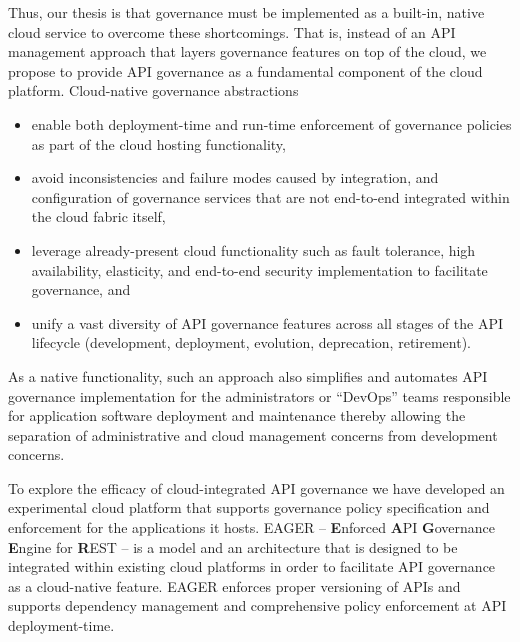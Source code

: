 Thus, our thesis is that governance must be implemented as a built-in, native
cloud service to
overcome these shortcomings.
That is, instead of an API management
approach that layers governance features on top of the cloud, 
we propose to provide API governance as a fundamental component of the cloud
platform.  Cloud-native governance abstractions
\begin{itemize}
\item enable both deployment-time and run-time enforcement of governance
policies as part of the cloud hosting functionality,
\item avoid inconsistencies and failure modes caused  
by integration, and configuration of governance services that are not
end-to-end integrated within the cloud fabric itself, 
\item leverage already-present cloud functionality such as fault tolerance,
high availability, elasticity, and end-to-end security implementation to
facilitate governance, and
\item unify a vast diversity of API
governance features across all stages of the API lifecycle
(development, deployment, evolution, deprecation, retirement). 
\end{itemize}
As a native functionality, such an
approach also simplifies and automates API governance implementation for
the administrators or ``DevOps'' teams responsible for application
software deployment and
maintenance thereby allowing the separation of administrative and
cloud management concerns from development concerns.

To explore the efficacy of cloud-integrated API governance we have developed
an experimental cloud platform that supports governance policy specification
and enforcement for the applications it hosts. 
EAGER -- {\bf E}nforced {\bf A}PI {\bf G}overnance
{\bf E}ngine for {\bf R}EST -- is a model and an architecture that is designed
to be integrated within existing
cloud platforms in order to facilitate API governance as a 
cloud-native feature. EAGER enforces proper versioning of APIs and supports dependency 
management and comprehensive policy enforcement at API deployment-time. 

